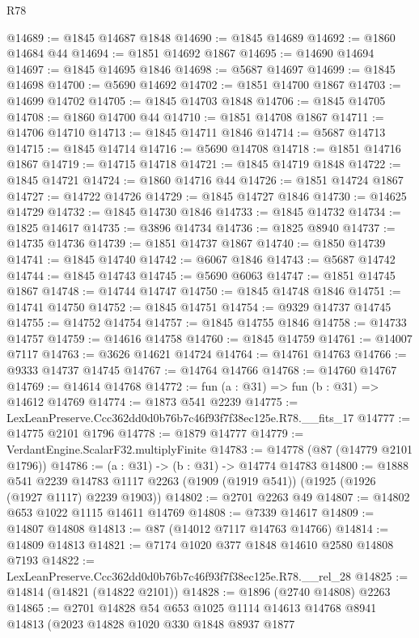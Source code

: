 \begin{lexlean}{R78}
\begin{coremodule}
@14689 := @1845 @14687 @1848
@14690 := @1845 @14689
@14692 := @1860 @14684 @44
@14694 := @1851 @14692 @1867
@14695 := @14690 @14694
@14697 := @1845 @14695 @1846
@14698 := @5687 @14697
@14699 := @1845 @14698
@14700 := @5690 @14692
@14702 := @1851 @14700 @1867
@14703 := @14699 @14702
@14705 := @1845 @14703 @1848
@14706 := @1845 @14705
@14708 := @1860 @14700 @44
@14710 := @1851 @14708 @1867
@14711 := @14706 @14710
@14713 := @1845 @14711 @1846
@14714 := @5687 @14713
@14715 := @1845 @14714
@14716 := @5690 @14708
@14718 := @1851 @14716 @1867
@14719 := @14715 @14718
@14721 := @1845 @14719 @1848
@14722 := @1845 @14721
@14724 := @1860 @14716 @44
@14726 := @1851 @14724 @1867
@14727 := @14722 @14726
@14729 := @1845 @14727 @1846
@14730 := @14625 @14729
@14732 := @1845 @14730 @1846
@14733 := @1845 @14732
@14734 := @1825 @14617
@14735 := @3896 @14734
@14736 := @1825 @8940
@14737 := @14735 @14736
@14739 := @1851 @14737 @1867
@14740 := @1850 @14739
@14741 := @1845 @14740
@14742 := @6067 @1846
@14743 := @5687 @14742
@14744 := @1845 @14743
@14745 := @5690 @6063
@14747 := @1851 @14745 @1867
@14748 := @14744 @14747
@14750 := @1845 @14748 @1846
@14751 := @14741 @14750
@14752 := @1845 @14751
@14754 := @9329 @14737 @14745
@14755 := @14752 @14754
@14757 := @1845 @14755 @1846
@14758 := @14733 @14757
@14759 := @14616 @14758
@14760 := @1845 @14759
@14761 := @14007 @7117
@14763 := @3626 @14621 @14724
@14764 := @14761 @14763
@14766 := @9333 @14737 @14745
@14767 := @14764 @14766
@14768 := @14760 @14767
@14769 := @14614 @14768
@14772 := fun (a : @31) => fun (b : @31) => @14612 @14769
@14774 := @1873 @541 @2239
@14775 := LexLeanPreserve.Ccc362dd0d0b76b7c46f93f7f38ec125e.R78.__fits_17
@14777 := @14775 @2101 @1796
@14778 := @1879 @14777
@14779 := VerdantEngine.ScalarF32.multiplyFinite
@14783 := @14778 (@87 (@14779 @2101 @1796))
@14786 := (a : @31) -> (b : @31) -> @14774 @14783
@14800 := @1888
    @541
    @2239
    @14783
    @1117
    @2263
    (@1909 (@1919 @541))
    (@1925 (@1926 (@1927 @1117) @2239 @1903))
@14802 := @2701 @2263 @49
@14807 := @14802 @653 @1022 @1115 @14611 @14769
@14808 := @7339 @14617
@14809 := @14807 @14808
@14813 := @87 (@14012 @7117 @14763 @14766)
@14814 := @14809 @14813
@14821 := @7174 @1020 @377 @1848 @14610 @2580 @14808 @7193
@14822 := LexLeanPreserve.Ccc362dd0d0b76b7c46f93f7f38ec125e.R78.__rel_28
@14825 := @14814 (@14821 (@14822 @2101))
@14828 := @1896 (@2740 @14808) @2263
@14865 := @2701
    @14828
    @54
    @653
    @1025
    @1114
    @14613
    @14768
    @8941
    @14813
    (@2023
      @14828
      @1020
      @330
      @1848
      @8937
      @1877

\end{coremodule}
\end{lexlean}
